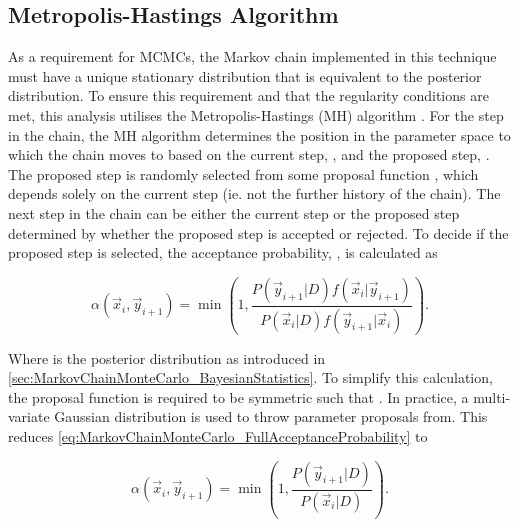 \subsection{Metropolis-Hastings Algorithm}
\label{sec:MarkovChainMonteCarlo_MetropoliseHastingsAlgorithm}

As a requirement for MCMCs, the Markov chain implemented in this technique must have a unique stationary distribution that is equivalent to the posterior distribution. To ensure this requirement and that the regularity conditions are met, this analysis utilises the Metropolis-Hastings (MH) algorithm \cite{metropolis, hastings}. For the  step in the chain, the MH algorithm determines the position in the parameter space to which the chain moves to based on the current step, , and the proposed step, . The proposed step is randomly selected from some proposal function , which depends solely on the current step (ie. not the further history of the chain). The next step in the chain  can be either the current step or the proposed step determined by whether the proposed step is accepted or rejected. To decide if the proposed step is selected, the acceptance probability, , is calculated as

\begin{equation}
  \label{eq:MarkovChainMonteCarlo_FullAcceptanceProbability}
  \alpha(\vec{x}_{i},\vec{y}_{i+1}) = \min\left(1,\frac{P(\vec{y}_{i+1}|D)f(\vec{x}_{i}|\vec{y}_{i+1})}{P(\vec{x}_{i}|D)f(\vec{y}_{i+1}|\vec{x}_{i})} \right).
\end{equation}

Where  is the posterior distribution as introduced in \autoref{sec:MarkovChainMonteCarlo_BayesianStatistics}. To simplify this calculation, the proposal function is required to be symmetric such that . In practice, a multi-variate Gaussian distribution is used to throw parameter proposals from. This reduces \autoref{eq:MarkovChainMonteCarlo_FullAcceptanceProbability} to

\begin{equation}
  \label{eq:MarkovChainMonteCarlo_ReducedAcceptanceProbability}
  \alpha(\vec{x}_{i},\vec{y}_{i+1}) = \min\left(1,\frac{P(\vec{y}_{i+1}|D)}{P(\vec{x}_{i}|D)} \right).
\end{equation}

